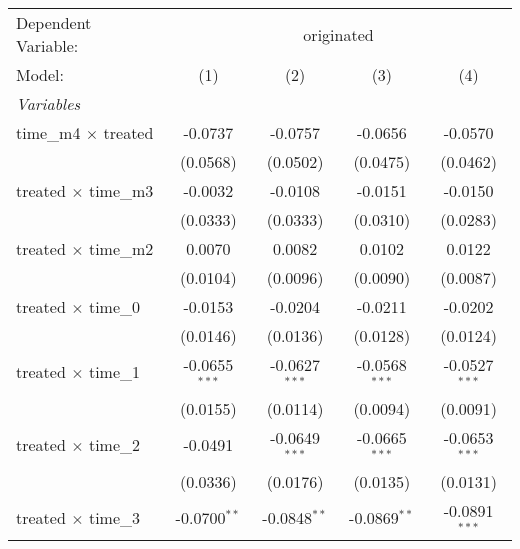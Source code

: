\begingroup
\centering
\begin{tabular}{lcccc}
   \tabularnewline \midrule \midrule
   Dependent Variable: & \multicolumn{4}{c}{originated}\\
   Model:                                              & (1)             & (2)             & (3)             & (4)\\  
   \midrule
   \emph{Variables}\\
   time\_m4 $\times$ treated                           & -0.0737         & -0.0757         & -0.0656         & -0.0570\\   
                                                       & (0.0568)        & (0.0502)        & (0.0475)        & (0.0462)\\   
   treated $\times$ time\_m3                           & -0.0032         & -0.0108         & -0.0151         & -0.0150\\   
                                                       & (0.0333)        & (0.0333)        & (0.0310)        & (0.0283)\\   
   treated $\times$ time\_m2                           & 0.0070          & 0.0082          & 0.0102          & 0.0122\\   
                                                       & (0.0104)        & (0.0096)        & (0.0090)        & (0.0087)\\   
   treated $\times$ time\_0                            & -0.0153         & -0.0204         & -0.0211         & -0.0202\\   
                                                       & (0.0146)        & (0.0136)        & (0.0128)        & (0.0124)\\   
   treated $\times$ time\_1                            & -0.0655$^{***}$ & -0.0627$^{***}$ & -0.0568$^{***}$ & -0.0527$^{***}$\\   
                                                       & (0.0155)        & (0.0114)        & (0.0094)        & (0.0091)\\   
   treated $\times$ time\_2                            & -0.0491         & -0.0649$^{***}$ & -0.0665$^{***}$ & -0.0653$^{***}$\\   
                                                       & (0.0336)        & (0.0176)        & (0.0135)        & (0.0131)\\   
   treated $\times$ time\_3                            & -0.0700$^{**}$  & -0.0848$^{**}$  & -0.0869$^{**}$  & -0.0891$^{***}$\\   

\end{tabular}
